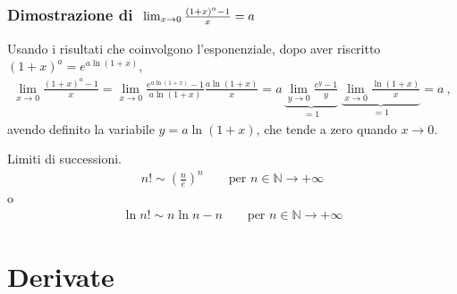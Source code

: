 \documentclass[letterpaper,10pt,italian]{jupyterBook}
\begin{document}
\subsubsection*{Dimostrazione di \protect\(\ \lim_{x \rightarrow 0} \frac{(1+x)^a - 1}{x} = a \protect\)}

\sphinxAtStartPar
Usando i risultati che coinvolgono l’esponenziale, dopo aver riscritto \((1+x)^a = e^{a \ln(1+x)}\),
\begin{equation*}
\begin{split} \lim_{x \rightarrow 0} \frac{(1+x)^a - 1}{x} = \lim_{x \rightarrow 0} \frac{e^{a \ln(1+x)} - 1}{a \ln (1+x)} \frac{a \ln(1+x)}{x} = a \, \underbrace{\lim_{y \rightarrow 0} \frac{e^y - 1}{y}}_{=1} \ \underbrace{\lim_{x \rightarrow 0} \frac{\ln(1+x)}{x}}_{=1} = a \ , \end{split}
\end{equation*}
\sphinxAtStartPar
avendo definito la variabile \(y = a \ln (1+x)\), che tende a zero quando \(x \rightarrow 0\).  

\sphinxAtStartPar
{} 
Limiti di successioni. 
\begin{equation*}
\begin{split}n! \sim \left(\frac{n}{e} \right)^n \qquad \text{per $n \in \mathbb{N} \rightarrow +\infty$}\end{split}
\end{equation*}
\sphinxAtStartPar
o
\begin{equation*}
\begin{split}\ln n! \sim n \ln n - n  \qquad \text{per $n \in \mathbb{N} \rightarrow +\infty$}\end{split}
\end{equation*}
\sphinxstepscope


\section{Derivate}
\label{\detokenize{ch/infinitesimal_calculus/derivatives:derivate}}\label{\detokenize{ch/infinitesimal_calculus/derivatives:infinitesimal-calculus-derivatives}}\label{\detokenize{ch/infinitesimal_calculus/derivatives::doc}}
\end{document}
